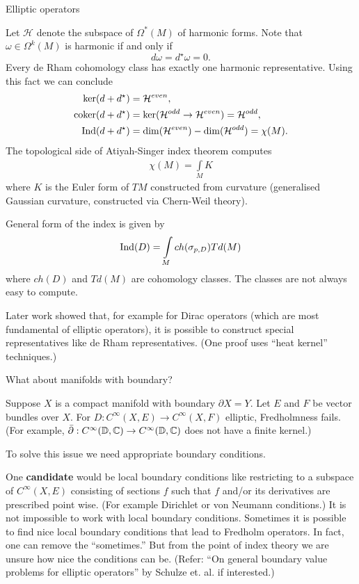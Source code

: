 \begin{clear}{Elliptic operators}
\begin{example}
Let $\mathcal{H}$ denote the subspace of $\Omega^* (M)$ of harmonic forms. Note that $\omega \in \Omega^k(M)$ is harmonic if and only if $$d\omega = d^\star\omega = 0.$$
 Every de Rham cohomology class has exactly one harmonic representative. 
Using this fact we can conclude
\begin{align*}
\ker (d + d^\star) &= \mathcal{H}^{even},\\
\operatorname{\mathrm{coker}} (d + d^\star ) &= \ker (\mathcal{H}^{odd} \to \mathcal{H}^{even}) = \mathcal{H}^{odd},\\
\mathrm{Ind} (d + d^\star) & = \dim (\mathcal{H}^{even}) - \dim (\mathcal{H}^{odd}) = \chi (M).
\end{align*}
The topological side of Atiyah-Singer index theorem computes
\begin{align*}
\chi(M) = \int\limits_M K
\end{align*}
where $K$ is the Euler form of $TM$ constructed from curvature (generalised Gaussian curvature, constructed via Chern-Weil theory).
\end{example}

General form of the index is given by
\begin{align*}
\mathrm{Ind} (D) = \int\limits_M ch(\sigma_{p,D}) Td(M)
\end{align*}
where $ch(D)$ and $Td(M)$ are cohomology classes. The classes are not always easy to compute.

Later work showed that, for example for Dirac operators (which are most fundamental of elliptic operators), it is possible to construct special representatives like de Rham representatives. (One proof uses ``heat kernel'' techniques.)

\begin{clear}{What about manifolds with boundary?}

Suppose $X$ is a compact manifold with boundary $\partial X = Y$. Let $E$ and $F$ be vector bundles over $X$. For $D: C^\infty (X,E) \to C^\infty (X, F)$ elliptic, Fredholmness fails. (For example, $\bar{\partial} : C^\infty(\mathbb{D}, \mathbb{C}) \to C^\infty(\mathbb{D}, \mathbb{C})$ does not have a finite kernel.)

To solve this issue we need appropriate boundary conditions.

One {\bf candidate} would be local boundary conditions like restricting to a subspace of $C^\infty (X,E)$ consisting of sections $f$ such that $f$ and/or its derivatives are prescribed point wise. (For example Dirichlet or von Neumann conditions.) It is not impossible to work with local boundary conditions. Sometimes it is possible to find nice local boundary conditions that lead to Fredholm operators. In fact, one can remove the ``sometimes.'' But from the point of index theory we are unsure how nice the conditions can be. (Refer: ``On general boundary value problems for elliptic operators'' by Schulze et. al. if interested.)


\end{clear}
\end{clear}
